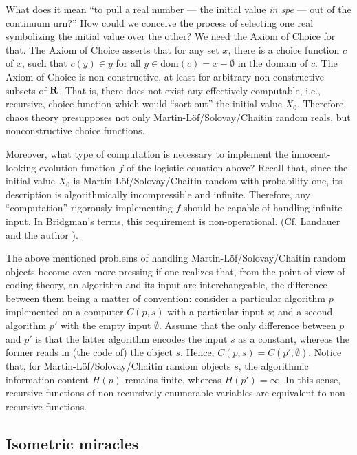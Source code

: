 What does it mean ``to pull a real number --- the initial value {\it
in spe} --- out of the continuum urn?''
How could we conceive the process of selecting one real symbolizing
the initial value over the other? We need the Axiom of Choice for that.
The Axiom of Choice asserts that for any set $x$, there is a choice
function $c$ of $x$, such that
 $c(y)\in y$ for all $y\in \mbox{dom}(c)=x-\emptyset$ in the domain of
$c$. The Axiom of Choice is non-constructive,
at least for arbitrary non-constructive subsets of ${\Bbb R}$. That is,
there does
not exist any effectively computable, i.e.,  recursive, choice function
which would ``sort out'' the initial value $X_0$. Therefore, chaos
theory presupposes not only
Mar\-tin-L\"of\-/So\-lo\-vay/\-Chai\-tin random reals,
but nonconstructive choice functions.

Moreover, what type of computation is necessary to implement the
innocent-looking evolution function $f$ of the logistic equation above?
Recall that, since the initial value $X_0$ is
Mar\-tin-L\"of\-/So\-lo\-vay/\-Chai\-tin random with probability one,
its description is algorithmically incompressible and infinite.
Therefore, any ``computation'' rigorously implementing $f$ should be
capable of handling infinite input. In Bridgman's terms, this
requirement is non-operational. (Cf. Landauer \cite{landauer-onlim}
and the author \cite{svozil-93}).

The above mentioned problems of handling
Mar\-tin-L\"of\-/So\-lo\-vay/\-Chai\-tin random
objects become even more pressing if one realizes that, from the point
of view of coding theory, an algorithm and its input are
interchangeable, the difference between them being a matter of
convention:
consider a particular algorithm $p$ implemented on a computer
$C(p,s)$ with a particular input
$s$; and a second algorithm $p'$ with the empty input $\emptyset$.
Assume that the only difference between $p$ and $p'$ is that the latter
algorithm encodes the input $s$ as a constant, whereas the former reads
in (the code of) the object $s$.
Hence, $C(p,s) =C(p',\emptyset )$. Notice that, for
Mar\-tin-L\"of\-/So\-lo\-vay/\-Chai\-tin random objects $s$,
the algorithmic information content $H(p)$ remains finite, whereas
$H(p')=\infty $. In this sense, recursive functions of non-recursively
enumerable variables are equivalent to non-recursive functions.




 \subsection{Isometric miracles}


